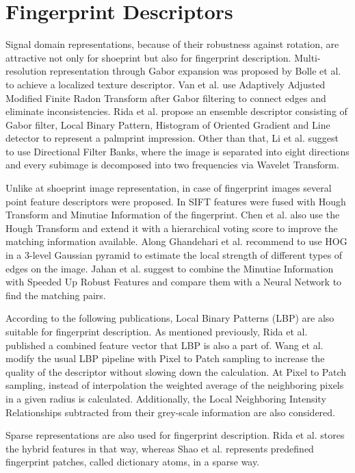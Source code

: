 \documentclass[draft,final]{vutinfth} %
\begin{document}
\section*{Fingerprint Descriptors}
\par
Signal domain representations, because of their robustness against rotation, are attractive not only for shoeprint but also for fingerprint description.
Multi-resolution representation through Gabor expansion was proposed by Bolle et al. \cite{bolle2012fingerprint} to achieve a localized texture descriptor.
Van et al. \cite{van2016fingerprint} use Adaptively Adjusted Modified Finite Radon Transform after Gabor filtering to connect edges and eliminate inconsistencies.
Rida et al. \cite{rida2018palmprint} propose an ensemble descriptor consisting of Gabor filter, Local Binary Pattern, Histogram of Oriented Gradient and Line detector to represent a palmprint impression.
Other than that, Li et al. \cite{li2012texture} suggest to use Directional Filter Banks, where the image is separated into eight directions and every subimage is decomposed into two frequencies via Wavelet Transform. 
\par 
Unlike at shoeprint image representation, in case of fingerprint images several point feature descriptors were proposed.
In \cite{zhou2011adaptive} SIFT features were fused with Hough Transform and Minutiae Information of the fingerprint.
Chen et al. \cite{chen2013hierarchical} also use the Hough Transform and extend it with a hierarchical voting score to improve the matching information available. 
Along  \cite{rida2018palmprint} Ghandehari et al. \cite{ghandehari2012palmprint} recommend to use HOG in a 3-level Gaussian pyramid to estimate the local strength of different types of edges on the image.
Jahan et al. \cite{jahan2017robust} suggest to combine the Minutiae Information with Speeded Up Robust Features and compare them with a Neural Network to find the matching pairs.
\par
According to the following publications, Local Binary Patterns (LBP) are also suitable for fingerprint description.
As mentioned previously, Rida et al. \cite{rida2018palmprint} published a combined feature vector that LBP is also a part of.
Wang et al. \cite{wang2013pixel} modify the usual LBP pipeline with Pixel to Patch sampling to increase the quality of the descriptor without slowing down the calculation.
At Pixel to Patch sampling,  instead of interpolation the weighted average of the neighboring pixels in a given radius is calculated. 
Additionally, the Local Neighboring Intensity Relationships subtracted from their grey-scale information are also considered.
\par
Sparse representations are also used for fingerprint description.
Rida et al. \cite{rida2018palmprint} stores the hybrid features in that way, whereas Shao et al. \cite{shao2013fingerprint} represents predefined fingerprint patches, called dictionary atoms, in a sparse way.
\end{document}
